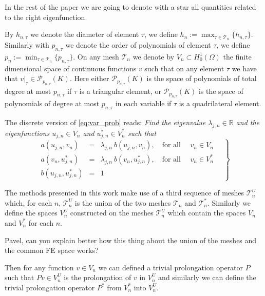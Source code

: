 \documentclass[smallextended]{svjour3}
\begin{document}
In the rest of the paper we are going to denote with a star all quantities related to the right eigenfunction.

By $h_{n,\tau}$ we denote the diameter of element $\tau$,  
we define
$
h_n:=\max_{\tau\in \mathcal{T}_n}\{h_{n,\tau}\}.
$
Similarly with  $p_{n,\tau}$ we denote  the order of polynomials of element $\tau$,  
we define
$
p_n:=\min_{\tau\in \mathcal{T}_n}\{p_{n,\tau}\}.
$
On any mesh $\mathcal{T}_n$ we denote by $V_n \subset H^1_0(\Omega)$ the finite
dimensional space of continuous functions $v$ such that on any element $\tau$ we 
have that $v|_\tau\in \mathcal{P}_{p_{n,\tau}}(K)$. Here either $\mathcal{P}_{p_{n,\tau}}(K)$ 
is the space of polynomials of total degree at most $p_{n,\tau}$ if $\tau$ is a triangular 
element, or $\mathcal{P}_{p_{n,\tau}}(K)$ is the space of polynomials of degree at most 
$p_{n,\tau}$ in each variable if $\tau$ is a quadrilateral element.



The discrete version of \eqref{eq:var_prob} reads:
\emph{Find the eigenvalue $\lambda_{j,n}\in \mathbb{R}$ and the eigenfunctions $u_{j,n}\in V_n$ and $u_{j,n}^*\in V_n^*$
such that}
\begin{equation}
\label{eq:disc_prob}
\left.
\begin{array}{lcl}
a(u_{j,n},v_{n})&=& \lambda_{j,n}\ b(u_{j,n},v_{n}),
\quad \text{for all } \quad v_{n}  \in V_n\\
a(v_{n},u_{j,n}^*)&=& \lambda_{j,n}\ b(v_{n},u_{j,n}^*),
\quad \text{for all } \quad v_{n}  \in V_n^*\\
 b(u_{j,n},u_{j,n}^*) &=& 1
\end{array}\quad
\right\}
\end{equation}

The methods presented in this work make use of a third sequence of meshes $\mathcal{T}_n^U$ which, for each $n$, $\mathcal{T}_n^U$ is the union of the two meshes  $\mathcal{T}_n$ and $\mathcal{T}_n^*$. Similarly we define the spaces $V_n^U$ constructed on the meshes $\mathcal{T}_n^U$ which contain the spaces $V_n$ and $V_n^*$ for each $n$. 

{Pavel, can you explain better how this thing about the union of the meshes and the common FE space works?}

Then for any function $v\in V_n$ we can defined a trivial prolongation operator $P$ such that $Pv\in V_n^U$ is the prolongation of $v$ in $V_n^U$ and similarly we can define the trivial prolongation operator $P^*$ from $V_n^*$ into $V_n^U$. %
\end{document}
